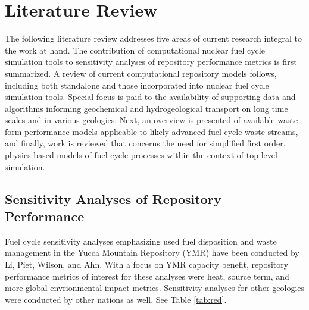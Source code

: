 \chapter{Literature Review}
The following literature review addresses five areas of current research integral to the work at hand. The contribution of computational nuclear fuel cycle simulation tools to sensitivity analyses of repository performance metrics is first summarized. A review of current computational repository models follows, including both standalone and those incorporated into nuclear fuel cycle simulation tools. Special focus is paid to the availability of supporting data and algorithms informing geochemical and hydrogeological transport on long time scales and in various geologies. Next, an overview is presented of available waste form performance models applicable to likely advanced fuel cycle waste streams, and finally, work is reviewed that concerns the need for simplified first order, physics based models of fuel cycle processes within the context of top level simulation. 
\section{Sensitivity Analyses of Repository Performance}
Fuel cycle sensitivity analyses emphasizing used fuel disposition and waste management in the Yucca Mountain Repository (YMR) have been conducted by Li, Piet, Wilson, and Ahn. With a focus on YMR capacity benefit, repository performance metrics of interest for these analyses were heat, source term, and more global envrionmental impact metrics. Sensitivity analyses for other geologies were conducted by other nations as well. See Table \ref{tab:red}.

